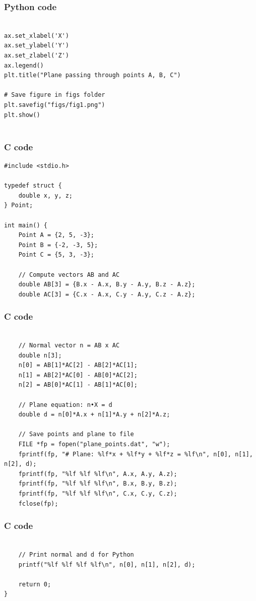 \documentclass{beamer}
\begin{document}
\begin{frame}[fragile]                            
\frametitle{Python code}                
\begin{lstlisting}

ax.set_xlabel('X')
ax.set_ylabel('Y')
ax.set_zlabel('Z')
ax.legend()
plt.title("Plane passing through points A, B, C")

# Save figure in figs folder
plt.savefig("figs/fig1.png")
plt.show()


\end{lstlisting}

\end{frame}


\begin{frame}[fragile]                            
\frametitle{C code}                
\begin{lstlisting}
#include <stdio.h>

typedef struct {
    double x, y, z;
} Point;

int main() {
    Point A = {2, 5, -3};
    Point B = {-2, -3, 5};
    Point C = {5, 3, -3};

    // Compute vectors AB and AC
    double AB[3] = {B.x - A.x, B.y - A.y, B.z - A.z};
    double AC[3] = {C.x - A.x, C.y - A.y, C.z - A.z};
\end{lstlisting}
\end{frame}

\begin{frame}[fragile]                            
\frametitle{C code}               
\begin{lstlisting}

    // Normal vector n = AB x AC
    double n[3];
    n[0] = AB[1]*AC[2] - AB[2]*AC[1];
    n[1] = AB[2]*AC[0] - AB[0]*AC[2];
    n[2] = AB[0]*AC[1] - AB[1]*AC[0];

    // Plane equation: n•X = d
    double d = n[0]*A.x + n[1]*A.y + n[2]*A.z;

    // Save points and plane to file
    FILE *fp = fopen("plane_points.dat", "w");
    fprintf(fp, "# Plane: %lf*x + %lf*y + %lf*z = %lf\n", n[0], n[1], n[2], d);
    fprintf(fp, "%lf %lf %lf\n", A.x, A.y, A.z);
    fprintf(fp, "%lf %lf %lf\n", B.x, B.y, B.z);
    fprintf(fp, "%lf %lf %lf\n", C.x, C.y, C.z);
    fclose(fp);
\end{lstlisting}
\end{frame}

\begin{frame}[fragile]                            
\frametitle{C code}               
\begin{lstlisting}

    // Print normal and d for Python
    printf("%lf %lf %lf %lf\n", n[0], n[1], n[2], d);

    return 0;
}


\end{lstlisting}
\end{frame}
\end{document}
